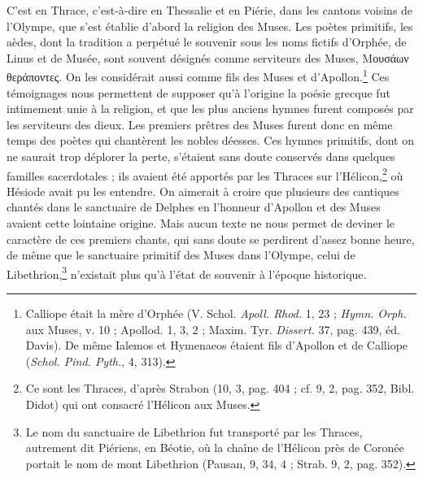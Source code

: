 \documentclass[landscape, a4paper, 11pt, oneside, polutonikogreek, french]{article}
\begin{document}
C'est en Thrace, c'est-à-dire en Thessalie et en Piérie, dans les cantons voisins de l'Olympe, que s'est établie d'abord la religion des Muses. Les poètes primitifs, les aèdes, dont la tradition a perpétué le souvenir sous les noms fictifs d'Orphée, de Linus et de Musée, sont souvent désignés comme serviteurs des Muses, Μουσάων θεράποντες. On les considérait aussi comme fils des Muses et d'Apollon.\footnote{Calliope était la mère d'Orphée (V. Schol. \emph{Apoll. Rhod.} 1, 23 ; \emph{Hymn. Orph.} aux Muses, v. 10 ; Apollod. 1, 3, 2 ; Maxim. Tyr. \emph{Dissert.} 37, pag. 439, éd. Davis). De même Ialemos et Hymenaeos étaient fils d'Apollon et de Calliope (\emph{Schol. Pind. Pyth.}, 4, 313).} Ces témoignages nous permettent de supposer qu'à l'origine la poésie grecque fut intimement unie à la religion, et que les plus anciens hymnes furent composés par les serviteurs des dieux. Les premiers prêtres des Muses furent donc en même temps des poètes qui chantèrent les nobles déesses. Ces hymnes primitifs, dont on ne saurait trop déplorer la perte, s'étaient sans doute conservés dans quelques familles sacerdotales ; ils avaient été apportés par les Thraces sur l'Hélicon,\footnote{Ce sont les Thraces, d'après Strabon (10, 3, pag. 404 ; cf. 9, 2, pag. 352, Bibl. Didot) qui ont consacré l'Hélicon aux Muses.} où Hésiode avait pu les entendre. On aimerait à croire que plusieurs des cantiques chantés dans le sanctuaire de Delphes en l'honneur d'Apollon et des Muses avaient cette lointaine origine. Mais aucun texte ne nous permet de deviner le caractère de ces premiers chants, qui sans doute se perdirent d'assez bonne heure, de même que le sanctuaire primitif des Muses dans l'Olympe, celui de Libethrion,\footnote{Le nom du sanctuaire de Libethrion fut transporté par les Thraces, autrement dit Piériens, en Béotie, où la chaîne de l'Hélicon près de Coronée portait le nom de mont Libethrion (Pausan, 9, 34, 4 ; Strab. 9, 2, pag. 352).} n'existait plus qu'à l'état de souvenir à l'époque historique.
\end{document}
